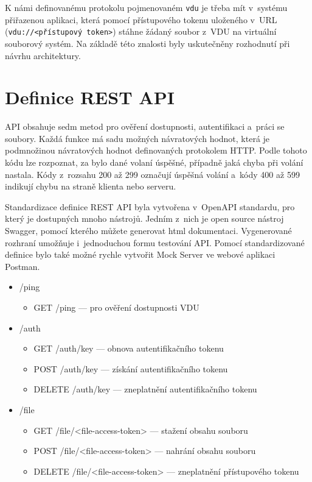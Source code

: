 K námi definovanému protokolu pojmenovaném \texttt{vdu} je třeba mít v systému přiřazenou aplikaci, která pomocí přístupového tokenu uloženého v URL 
(\texttt{vdu://<přístupový token>}) stáhne žádaný soubor z VDU na virtuální souborový systém. Na základě této znalosti byly uskutečněny rozhodnutí při návrhu architektury.
 
\section{Definice REST API}

API obsahuje sedm metod pro ověření dostupnosti, autentifikaci a práci se soubory. Každá funkce má sadu možných návratových hodnot, která je podmnožinou návratových hodnot
definovaných protokolem HTTP. Podle tohoto kódu lze rozpoznat, za bylo dané volaní úspěšné, případně jaká chyba při volání nastala. Kódy z rozsahu 200 až 299 označují
úspěšná volání a kódy 400 až 599 indikují chybu na straně klienta nebo serveru.

Standardizace definice REST API byla vytvořena v OpenAPI standardu, pro který je dostupných mnoho nástrojů. Jedním z nich je open source nástroj Swagger, pomocí kterého
můžete generovat html dokumentaci. Vygenerované rozhraní umožňuje i jednoduchou formu testování API. Pomocí standardizované definice bylo také možné rychle vytvořit 
Mock Server ve webové aplikaci Postman.

\begin{itemize}
    \item /ping
    \begin{itemize}
        \item GET /ping — pro ověření dostupnosti VDU        
    \end{itemize}
    \item /auth
    \begin{itemize}
        \item GET /auth/key — obnova autentifikačního tokenu
        \item POST /auth/key — získání autentifikačního tokenu
        \item DELETE /auth/key — zneplatnění autentifikačního tokenu
    \end{itemize}
    \item /file
    \begin{itemize}
        \item GET /file/<file-access-token> — stažení obsahu souboru
        \item POST /file/<file-access-token> — nahrání obsahu souboru
        \item DELETE /file/<file-access-token> — zneplatnění přístupového tokenu
    \end{itemize}
\end{itemize}

